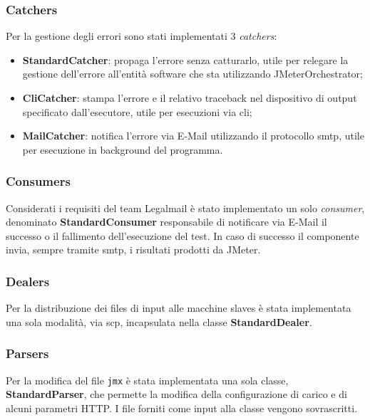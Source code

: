 \subsubsection{Catchers}
Per la gestione degli errori sono stati implementati 3 \textit{catchers}:
\begin{itemize}
	\item \textbf{StandardCatcher}: propaga l'errore senza catturarlo, utile per relegare la gestione dell'errore all'entità software che sta utilizzando JMeterOrchestrator;
	\item \textbf{CliCatcher}: stampa l'errore e il relativo \gls{traceback} nel dispositivo di output specificato dall'esecutore, utile per esecuzioni via \gls{cli};
	\item \textbf{MailCatcher}: notifica l'errore via E-Mail utilizzando il protocollo \gls{smtp}, utile per esecuzione in background del programma.
\end{itemize}
\subsubsection{Consumers}
Considerati i requisiti del team Legalmail è stato implementato un solo \textit{consumer}, denominato \textbf{StandardConsumer} responsabile di notificare via E-Mail il successo o il fallimento dell'esecuzione del test. In caso di successo il componente invia, sempre tramite \gls{smtp}, i risultati prodotti da JMeter. 
\subsubsection{Dealers}
Per la distribuzione dei files di input alle macchine slaves è stata implementata una sola modalità, via \gls{scp}, incapsulata nella classe \textbf{StandardDealer}.
\subsubsection{Parsers}
Per la modifica del file \texttt{jmx} è stata implementata una sola classe, \textbf{StandardParser}, che permette la modifica della configurazione di carico e di alcuni parametri HTTP. I file forniti come input alla classe vengono sovrascritti.
